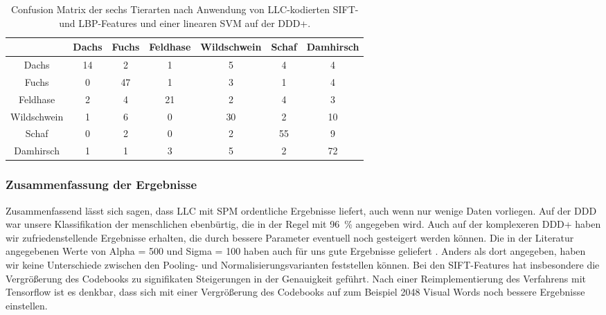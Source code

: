 \begin{table}
	\centering
	\begin{tabular}{|c|c|c|c|c|c|c|}
		\hline
		& Dachs & Fuchs & Feldhase & Wildschwein & Schaf & Damhirsch \\
		\hline
		Dachs & 14 & 2 & 1 & 5 & 4 & 4 \\ \hline
		Fuchs & 0 & 47 & 1 & 3 & 1 & 4 \\ \hline
		Feldhase & 2 & 4 & 21 & 2 & 4 & 3 \\ \hline
		Wildschwein & 1 & 6 & 0 & 30 & 2 & 10 \\ \hline
		Schaf & 0 & 2 & 0 & 2 & 55 & 9 \\ \hline
		Damhirsch & 1 & 1 & 3 & 5 & 2 & 72 \\
		\hline
	\end{tabular}
	\caption{Confusion Matrix der sechs Tierarten nach Anwendung von LLC-kodierten SIFT- und LBP-Features und einer linearen SVM auf der DDD+.}
\end{table}

\subsubsection{Zusammenfassung der Ergebnisse}

Zusammenfassend lässt sich sagen, dass LLC mit SPM ordentliche Ergebnisse liefert, auch wenn nur wenige Daten vorliegen. Auf der DDD war unsere Klassifikation der menschlichen ebenbürtig, die in der Regel mit 96~\% angegeben wird. Auch auf der komplexeren DDD+ haben wir zufriedenstellende Ergebnisse erhalten, die durch bessere Parameter eventuell noch gesteigert werden können. Die in der Literatur angegebenen Werte von Alpha = 500 und Sigma = 100 haben auch für uns gute Ergebnisse geliefert \cite{wyylhg10}. Anders als dort angegeben, haben wir keine Unterschiede zwischen den Pooling- und Normalisierungsvarianten feststellen können. Bei den SIFT-Features hat insbesondere die Vergrößerung des Codebooks zu signifikaten Steigerungen in der Genauigkeit geführt. Nach einer Reimplementierung des Verfahrens mit Tensorflow ist es denkbar, dass sich mit einer Vergrößerung des Codebooks auf zum Beispiel 2048 Visual Words noch bessere Ergebnisse einstellen.